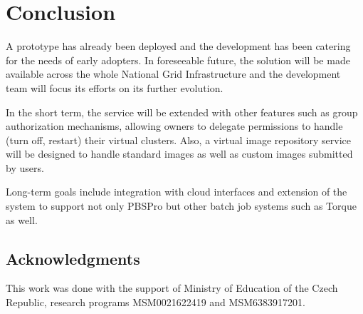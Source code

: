 \documentclass[a4paper]{article}
\begin{document}
\section{Conclusion}

A prototype has already been deployed and the development has been catering for the needs of early adopters.
In foreseeable future, the solution will be made available across the whole National Grid Infrastructure and the development team will focus its efforts on its further evolution.

In the short term, the service will be extended with other features such as group authorization mechanisms, allowing owners to delegate permissions to handle (turn off, restart) their virtual clusters. Also, a virtual image repository service will be designed to handle standard images as well as custom images submitted by users.

Long-term goals include integration with cloud interfaces and extension of the system to support not only PBSPro but other batch job systems such as Torque as well.

\subsection*{Acknowledgments} 
This work was done with the support of Ministry of Education of the Czech
Republic, research programs MSM0021622419 and MSM6383917201.
\end{document}
